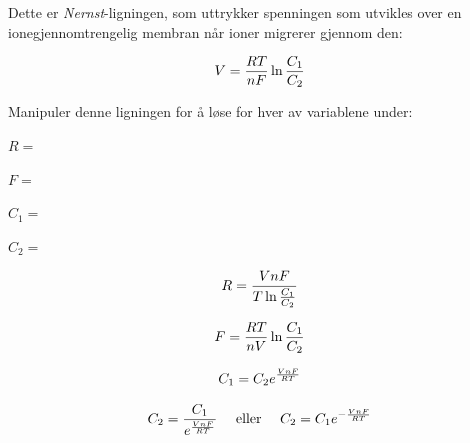 

Dette er {\it Nernst}-ligningen, som uttrykker spenningen som utvikles over en ionegjennomtrengelig membran når ioner migrerer gjennom den:

$$V = {RT \over nF} \ln {C_1 \over C_2}$$

Manipuler denne ligningen for å løse for hver av variablene under:

\vskip 10pt

$R =$

\vskip 10pt

$F =$

\vskip 10pt

$C_1 =$

\vskip 10pt

$C_2 =$

\vskip 10pt







$$R = {VnF \over {T \ln {C_1 \over C_2}}}$$

\vskip 20pt

$$F = {RT \over nV} \ln {C_1 \over C_2}$$

\vskip 20pt

$$C_1 = C_2 e^{VnF \over RT}$$

\vskip 20pt

$$C_2 = {C_1 \over {e^{VnF \over RT}}} \hskip 10pt \hbox{ eller } \hskip 10pt C_2 = C_1 e^{-{VnF \over RT}}$$











